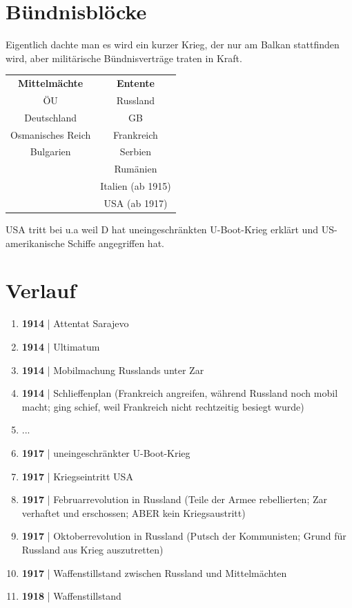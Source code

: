 \documentclass[a4paper, ngerman]{article}
\begin{document}
\section*{Bündnisblöcke}
Eigentlich dachte man es wird ein kurzer Krieg, der nur am Balkan stattfinden wird, aber militärische Bündnisverträge traten in Kraft.
\begin{center}
    \begin{tabular}{ c c }
        \textbf{Mittelmächte} & \textbf{Entente}  \\
        ÖU                    & Russland          \\
        Deutschland           & GB                \\
        Osmanisches Reich     & Frankreich        \\
        Bulgarien             & Serbien           \\
                              & Rumänien          \\
                              & Italien (ab 1915) \\
                              & USA (ab 1917)
    \end{tabular}
\end{center}
USA tritt bei u.a weil D hat uneingeschränkten U-Boot-Krieg erklärt und US-amerikanische Schiffe angegriffen hat.
\section*{Verlauf}
\begin{enumerate}
    \item \textbf{1914} | Attentat Sarajevo
    \item \textbf{1914} | Ultimatum
    \item \textbf{1914} | Mobilmachung Russlands unter Zar
    \item \textbf{1914} | Schlieffenplan (Frankreich angreifen, während Russland noch mobil macht; ging schief, weil
          Frankreich nicht rechtzeitig besiegt wurde)
    \item ...
    \item \textbf{1917} | uneingeschränkter U-Boot-Krieg
    \item \textbf{1917} | Kriegseintritt USA
    \item \textbf{1917} | Februarrevolution in Russland (Teile der Armee rebellierten; Zar verhaftet und erschossen; ABER kein Kriegsaustritt)
    \item \textbf{1917} | Oktoberrevolution in Russland (Putsch der Kommunisten; Grund für Russland aus Krieg auszutretten)
    \item \textbf{1917} | Waffenstillstand zwischen Russland und Mittelmächten
    \item \textbf{1918} | Waffenstillstand
\end{enumerate}
\end{document}
